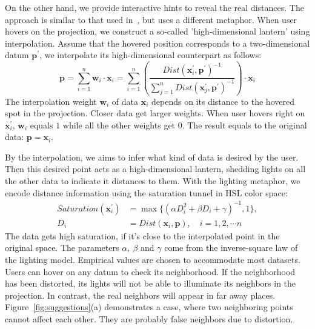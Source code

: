 On the other hand, we provide interactive hints to reveal the real distances. The approach is similar to that used in~\cite{DBLP:journals/tvcg/StahnkeDMT16}, but uses a different metaphor. When user hovers on the projection, we construct a so-called 'high-dimensional lantern' using interpolation. Assume that the hovered position corresponds to a two-dimensional datum $\mathbf{p}^{\prime}$, we interpolate its high-dimensional counterpart as follows:
\begin{equation}
\mathbf{p} = \sum\limits_{i=1}^{n}\mathbf{w}_{i}\cdot\mathbf{x}_{i} =  \sum\limits_{i=1}^{n} \left (\frac{Dist(\mathbf{x}_{i}^{\prime}, \mathbf{p}^{\prime})^{-1}}{\sum\limits_{j=1}^{n}Dist(\mathbf{x}_{j}^{\prime}, \mathbf{p}^{\prime})^{-1}}\right )\cdot\mathbf{x}_{i}
\end{equation}
The interpolation weight $\mathbf{w}_{i}$ of data $\mathbf{x}_{i}$ depends on its distance to the hovered spot in the projection. Closer data get larger weights. When user hovers right on $\mathbf{x}_{i}^{\prime}$, $\mathbf{w}_{i}$ equals $1$ while all the other weights get $0$. The result equals to the original data: $\mathbf{p} = \mathbf{x}_{i}$.

By the interpolation, we aims to infer what kind of data is desired by the user. Then this desired point acts as a high-dimensional lantern, shedding lights on all the other data to indicate it distances to them. With the lighting metaphor, we encode distance information using the saturation tunnel in HSL color space:
\begin{equation}
\begin{split}
Saturation(\mathbf{x}_{i}^{\prime}) &= \max{\{(\alpha D_{i}^{2} + \beta D_{i} + \gamma)^{-1}, 1\}},\\
D_{i} &= Dist(\mathbf{x}_{i}, \mathbf{p}), \quad i = 1,2,\cdots n
\end{split}
\end{equation}
The data gets high saturation, if it's close to the interpolated point in the original space. The parameters $\alpha,\ \beta$ and $\gamma$ come from the inverse-square law of the lighting model. Empirical values are chosen to accommodate most datasets. Users can hover on any datum to check its neighborhood. If the neighborhood has been distorted, its lights will not be able to illuminate its neighbors in the projection. In contrast, the real neighbors will appear in far away places. Figure~\ref{fig:suggestions}(a) demonstrates a case, where two neighboring points cannot affect each other. They are probably false neighbors due to distortion.

